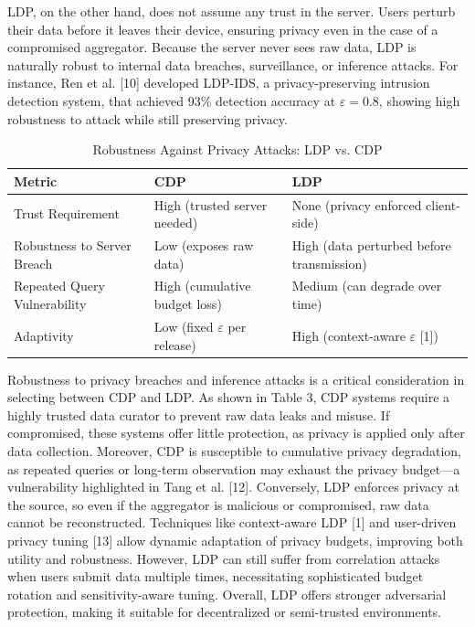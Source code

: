 \documentclass[conference]{IEEEtran}
\begin{document}
LDP, on the other hand, does not assume any trust in the server. Users perturb their data before it leaves their device, ensuring privacy even in the case of a compromised aggregator. Because the server never sees raw data, LDP is naturally robust to internal data breaches, surveillance, or inference attacks. For instance, Ren et al. [10] developed LDP-IDS, a privacy-preserving intrusion detection system, that achieved 93\% detection accuracy at $\varepsilon = 0.8$, showing high robustness to attack while still preserving privacy.

\begin{table}[h]
\centering
\renewcommand{\arraystretch}{1.3} %
\caption{Robustness Against Privacy Attacks: LDP vs. CDP}
\begin{tabular}{|p{2.5cm}|p{2.5cm}|p{2.5cm}|}
\hline
\textbf{Metric} & \textbf{CDP} & \textbf{LDP} \\
\hline
Trust Requirement & High (trusted server needed) & None (privacy enforced client-side) \\
\hline
Robustness to Server Breach & Low (exposes raw data) & High (data perturbed before transmission) \\
\hline
Repeated Query Vulnerability & High (cumulative budget loss) & Medium (can degrade over time) \\
\hline
Adaptivity & Low (fixed $\varepsilon$ per release) & High (context-aware $\varepsilon$ [1]) \\
\hline
\end{tabular}
\end{table}

Robustness to privacy breaches and inference attacks is a critical consideration in selecting between CDP and LDP. As shown in Table 3, CDP systems require a highly trusted data curator to prevent raw data leaks and misuse. If compromised, these systems offer little protection, as privacy is applied only after data collection. Moreover, CDP is susceptible to cumulative privacy degradation, as repeated queries or long-term observation may exhaust the privacy budget---a vulnerability highlighted in Tang et al. [12]. Conversely, LDP enforces privacy at the source, so even if the aggregator is malicious or compromised, raw data cannot be reconstructed. Techniques like context-aware LDP [1] and user-driven privacy tuning [13] allow dynamic adaptation of privacy budgets, improving both utility and robustness. However, LDP can still suffer from correlation attacks when users submit data multiple times, necessitating sophisticated budget rotation and sensitivity-aware tuning. Overall, LDP offers stronger adversarial protection, making it suitable for decentralized or semi-trusted environments.
\end{document}
